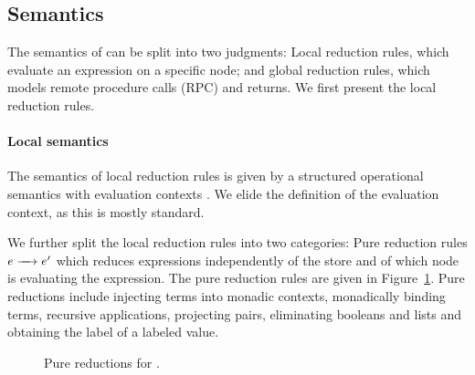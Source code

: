 \subsection{Semantics}\label{sec:semantics}
The semantics of \lang{} can be split into two judgments: Local reduction rules, which evaluate an expression on a specific node; and global reduction rules, which models remote procedure calls (RPC) and returns. We first present the local reduction rules.

\paragraph{Local semantics}
The semantics of local reduction rules is given by a structured operational semantics with evaluation contexts \cite{Felleisen:1988:TPF:73560.73576}. We elide the definition of the evaluation context, as this is mostly standard.

We further split the local reduction rules into two categories: Pure reduction rules $\steppure{\expr}{\expr'}$ which reduces expressions independently of the store and of which node is evaluating the expression. The pure reduction rules are given in Figure~\ref{fig:pure-reductions}. Pure reductions include injecting terms into monadic contexts, monadically binding terms, recursive applications, projecting pairs, eliminating booleans and lists and obtaining the label of a labeled value.

\begin{figure}
    \centering
    \caption{Pure reductions for \lang.}
    \label{fig:pure-reductions}
\end{figure}

